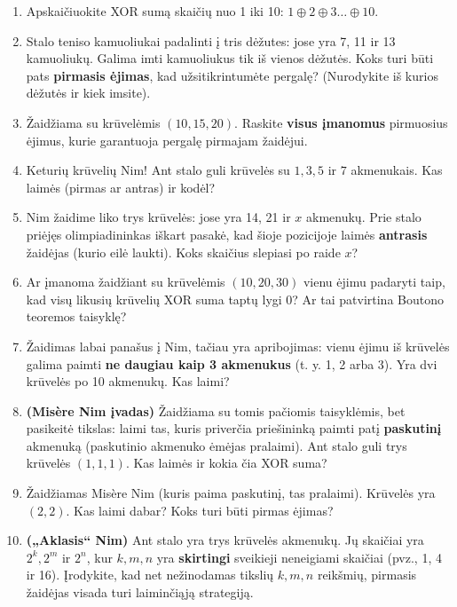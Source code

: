 \documentclass[11pt,a4paper]{scrartcl}
\begin{document}
\begin{enumerate}
    \item Apskaičiuokite XOR sumą skaičių nuo 1 iki 10: $1 \oplus 2 \oplus 3 \dots \oplus 10$.
    \item Stalo teniso kamuoliukai padalinti į tris dėžutes: jose yra 7, 11 ir 13 kamuoliukų. Galima imti kamuoliukus tik iš vienos dėžutės. Koks turi būti pats \textbf{pirmasis ėjimas}, kad užsitikrintumėte pergalę? (Nurodykite iš kurios dėžutės ir kiek imsite).
    \item Žaidžiama su krūvelėmis $(10, 15, 20)$. Raskite \textbf{visus įmanomus} pirmuosius ėjimus, kurie garantuoja pergalę pirmajam žaidėjui.
    \item Keturių krūvelių Nim! Ant stalo guli krūvelės su $1, 3, 5$ ir $7$ akmenukais. Kas laimės (pirmas ar antras) ir kodėl?
    \item Nim žaidime liko trys krūvelės: jose yra 14, 21 ir $x$ akmenukų. Prie stalo priėjęs olimpiadininkas iškart pasakė, kad šioje pozicijoje laimės \textbf{antrasis} žaidėjas (kurio eilė laukti). Koks skaičius slepiasi po raide $x$?
    
    \item Ar įmanoma žaidžiant su krūvelėmis $(10, 20, 30)$ vienu ėjimu padaryti taip, kad visų likusių krūvelių XOR suma taptų lygi 0? Ar tai patvirtina Boutono teoremos taisyklę?
    \item Žaidimas labai panašus į Nim, tačiau yra apribojimas: vienu ėjimu iš krūvelės galima paimti \textbf{ne daugiau kaip 3 akmenukus} (t. y. 1, 2 arba 3). Yra dvi krūvelės po 10 akmenukų. Kas laimi?
    \item \textbf{(Misère Nim įvadas)} Žaidžiama su tomis pačiomis taisyklėmis, bet pasikeitė tikslas: laimi tas, kuris priverčia priešininką paimti patį \textbf{paskutinį} akmenuką (paskutinio akmenuko ėmėjas pralaimi). Ant stalo guli trys krūvelės $(1, 1, 1)$. Kas laimės ir kokia čia XOR suma?
    \item Žaidžiamas Misère Nim (kuris paima paskutinį, tas pralaimi). Krūvelės yra $(2, 2)$. Kas laimi dabar? Koks turi būti pirmas ėjimas?
    \item \textbf{(„Aklasis“ Nim)} Ant stalo yra trys krūvelės akmenukų. Jų skaičiai yra $2^k, 2^m$ ir $2^n$, kur $k, m, n$ yra \textbf{skirtingi} sveikieji neneigiami skaičiai (pvz., 1, 4 ir 16). Įrodykite, kad net nežinodamas tikslių $k, m, n$ reikšmių, pirmasis žaidėjas visada turi laiminčiąją strategiją.
    

\end{enumerate}
\end{document}

